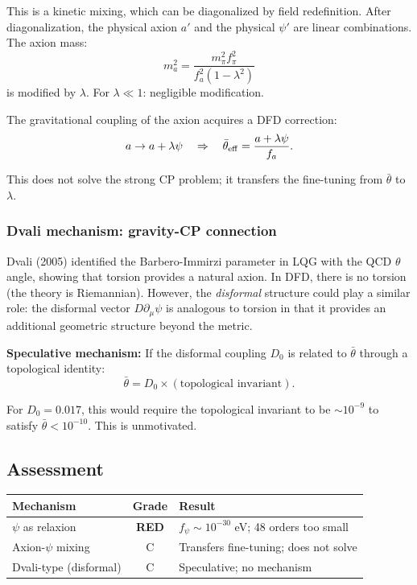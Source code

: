 \documentclass[11pt,a4paper]{article}
\newcommand{\RED}{\textcolor{dfdred}{\textbf{RED}}}
\begin{document}
This is a kinetic mixing, which can be diagonalized by field redefinition. After diagonalization, the physical axion $a'$ and the physical $\psi'$ are linear combinations. The axion mass:
\begin{equation}
m_a^2 = \frac{m_\pi^2 f_\pi^2}{f_a^2(1-\lambda^2)}
\end{equation}
is modified by $\lambda$. For $\lambda \ll 1$: negligible modification.

The gravitational coupling of the axion acquires a DFD correction:
\begin{equation}
a \to a + \lambda\psi \quad \Rightarrow \quad \bar\theta_{\rm eff} = \frac{a + \lambda\psi}{f_a}.
\end{equation}

This does not solve the strong CP problem; it transfers the fine-tuning from $\bar\theta$ to $\lambda$.

\subsubsection{Dvali mechanism: gravity-CP connection}

Dvali (2005) identified the Barbero-Immirzi parameter in LQG with the QCD $\theta$ angle, showing that torsion provides a natural axion. In DFD, there is no torsion (the theory is Riemannian). However, the \emph{disformal} structure could play a similar role: the disformal vector $D\partial_\mu\psi$ is analogous to torsion in that it provides an additional geometric structure beyond the metric.

\textbf{Speculative mechanism:} If the disformal coupling $D_0$ is related to $\bar\theta$ through a topological identity:
\begin{equation}
\bar\theta = D_0 \times (\text{topological invariant}).
\end{equation}

For $D_0 = 0.017$, this would require the topological invariant to be $\sim 10^{-9}$ to satisfy $\bar\theta < 10^{-10}$. This is unmotivated.

\subsection{Assessment}

\begin{center}
\begin{tabular}{lcl}
\toprule
\textbf{Mechanism} & \textbf{Grade} & \textbf{Result} \\
\midrule
$\psi$ as relaxion & \RED & $f_\psi \sim 10^{-30}$ eV; 48 orders too small \\
Axion-$\psi$ mixing & C & Transfers fine-tuning; does not solve \\
Dvali-type (disformal) & C & Speculative; no mechanism \\
\bottomrule
\end{tabular}
\end{center}
\end{document}
